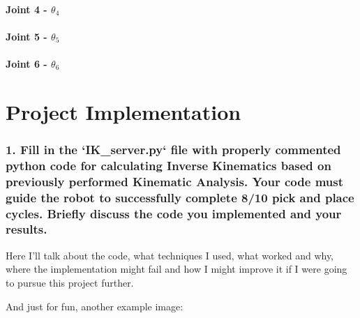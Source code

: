 \documentclass{article}
\begin{document}
\paragraph{Joint 4 - $\theta _4$}

\paragraph{Joint 5 - $\theta _5$}

\paragraph{Joint 6 - $\theta _6$}

\section{Project Implementation}

\subsubsection{1. Fill in the `IK\_server.py` file with properly commented python code for calculating Inverse Kinematics based on previously performed Kinematic Analysis. Your code must guide the robot to successfully complete 8/10 pick and place cycles. Briefly discuss the code you implemented and your results.}


Here I'll talk about the code, what techniques I used, what worked and why, where the implementation might fail and how I might improve it if I were going to pursue this project further.  


And just for fun, another example image:
\end{document}
